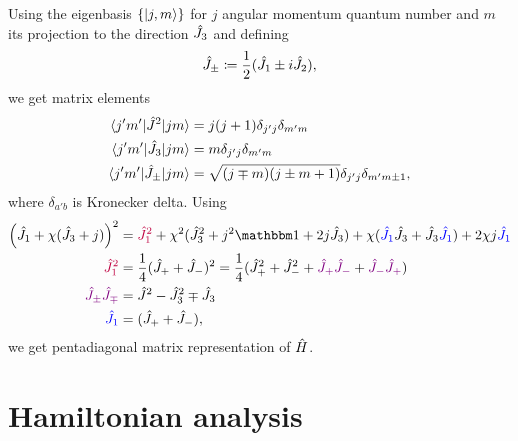 Using the eigenbasis $\{\ket{j,m}\}$ for $j$ angular momentum quantum number and $m$ its projection to the direction $\hat{J}_3$ and defining
\begin{equation}
    \hat{J}_\pm\coloneqq\frac{1}{2}(\hat{J}_1\pm i\hat{J}_2),
\end{equation}
we get matrix elements
\begin{align}
    \braket{j'm'|\hat{J}^2|jm} &= j(j+1)\delta_{j'j}\delta_{m'm}\\
    \braket{j'm'|\hat{J}_3|jm} &= m \delta_{j'j}\delta_{m'm}\\
    \braket{j'm'|\hat{J}_\pm|jm} &= \sqrt{(j\mp m)(j\pm m+1)}\delta_{j'j}\delta_{m'm\pm 1},
\end{align}
where $\delta_{a'b}$ is Kronecker delta. Using
\begin{align}
        \left(\J_1+\chi(\J_3+j)\right)^2 &= \textcolor{purple}{\J_1^2} +\chi^2 (\J_3^2+j^2\Id+2j\J_3)+\chi(\textcolor{blue}{\J_1}\J_3+\J_3\textcolor{blue}{\J_1})+2\chi j\textcolor{blue}{\J_1}\\
        \textcolor{purple}{\J_1^2}&= \frac{1}{4}(\J_++\J_-)^2= \frac{1}{4}(\J_+^2+\J_-^2+\textcolor{violet}{\J_+\J_-}+\textcolor{violet}{\J_-\J_+})\\ 
        \textcolor{violet}{\J_\pm\J_\mp}&=\J^2-\J_3^2 \mp \J_3\\
        \textcolor{blue}{\J_1}&=(\J_+ +\J_-),
\end{align}
we get pentadiagonal matrix representation of $\hat{H}$.


\section{Hamiltonian analysis}


